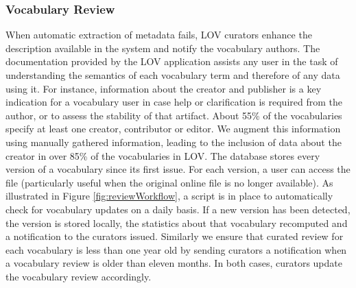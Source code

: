 \documentclass{iosart2c}
\begin{document}
	\subsubsection{Vocabulary Review}
When automatic extraction of metadata fails, LOV curators enhance the description available in the system and notify the vocabulary authors. The documentation provided by the LOV application assists any user in the task of understanding the semantics of each vocabulary term and therefore of any data using it. For instance, information about the creator and publisher is a key indication for a vocabulary user in case help or clarification is required from the author, or to assess the stability of that artifact. About 55\% of the vocabularies specify at least one creator, contributor or editor. We augment this information using manually gathered information, leading to the inclusion of data about the creator in over 85\% of the vocabularies in LOV. The database stores every version of a vocabulary since its first issue. For each version, a user can access the file (particularly useful when the original online file is no longer available). As illustrated in Figure \ref{fig:reviewWorkflow}, a script is in place to automatically check for vocabulary updates on a daily basis. If a new version has been detected, the version is stored locally, the statistics about that vocabulary recomputed and a notification to the curators issued. Similarly we ensure that curated review for each vocabulary is less than one year old by sending curators a notification when a vocabulary review is older than eleven months. In both cases, curators update the vocabulary review accordingly. 
\end{document}
